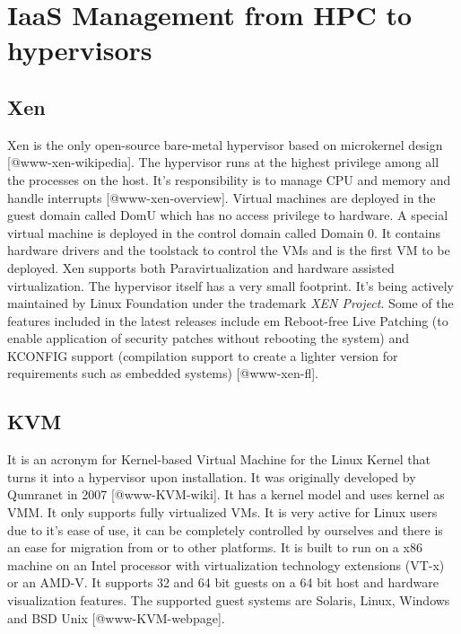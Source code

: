 \section{IaaS Management from HPC to hypervisors}

\subsection{Xen}

Xen is the only open-source bare-metal hypervisor based on microkernel
design [@www-xen-wikipedia]. The hypervisor runs at the highest
privilege among all the processes on the host. It's responsibility is
to manage CPU and memory and handle
interrupts [@www-xen-overview]. Virtual machines are deployed in
the guest domain called DomU which has no access privilege to
hardware. A special virtual machine is deployed in the control domain
called Domain 0. It contains hardware drivers and the toolstack to
control the VMs and is the first VM to be deployed. Xen supports both
Paravirtualization and hardware assisted virtualization. The
hypervisor itself has a very small footprint. It's being actively
maintained by Linux Foundation under the trademark \textit{XEN
  Project}. Some of the features included in the latest releases
include {em Reboot-free Live Patching} (to enable application of
security patches without rebooting the system) and KCONFIG support
(compilation support to create a lighter version for requirements such
as embedded systems) [@www-xen-fl].
          
\subsection{KVM}

It is an acronym for Kernel-based Virtual Machine for the Linux Kernel
that turns it into a hypervisor upon installation. It was originally
developed by Qumranet in 2007 [@www-KVM-wiki]. It has a kernel
model and uses kernel as VMM. It only supports fully virtualized
VMs. It is very active for Linux users due to it's ease of use, it can
be completely controlled by ourselves and there is an ease for
migration from or to other platforms. It is built to run on a x86
machine on an Intel processor with virtualization technology
extensions (VT-x) or an AMD-V. It supports 32 and 64 bit guests on a
64 bit host and hardware visualization features. The supported guest
systems are Solaris, Linux, Windows and BSD
Unix [@www-KVM-webpage].

